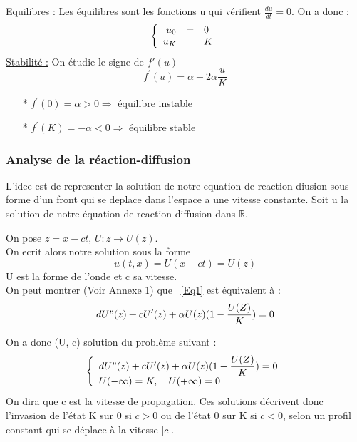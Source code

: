 \documentclass[a4paper,11pt]{article}
\begin{document}
\noindent\underline{Equilibres :} Les équilibres sont les fonctions u qui vérifient $\frac{du}{dt}=0$. On a donc :
\[
\left\{
\begin{array}{r c l}
u_0 &=& 0\\
u_K &=& K\\
\end{array}
\right.
\]
\underline{Stabilité :} On étudie le signe de $f'(u)$ 
$$f^\prime(u)= \alpha - 2 \alpha \dfrac{u}{K} $$

\begin{itemize}
    	\item[*] $f^\prime(0)=\alpha >0 \Rightarrow $ équilibre instable
        \item[*] $f^\prime(K)= -\alpha <0 \Rightarrow $ équilibre stable
	\end{itemize}


\subsubsection{Analyse de la réaction-diffusion}
\setcounter{equation}{0}
L'idee est de representer la solution de notre equation de
reaction-diusion sous forme d'un front qui se deplace dans l'espace a une vitesse constante.
Soit u la solution de notre équation de reaction-diffusion dans $\mathbb{R}$.

\noindent On pose $z=x-ct$, $U:z\rightarrow U(z)$.\\
On ecrit alors notre solution sous la forme
\begin{equation*}
u(t,x)=U(x-ct)=U(z)
\end{equation*}
U est la forme de l'onde et c sa vitesse.\\

On peut montrer (Voir Annexe 1) que ~\eqref{Eq1} est équivalent à :
\begin{equation*}
dU"(z)+c U'(z)+\alpha U(z)(1-\dfrac{U(Z)}{K})=0\\
\end{equation*} 

On a donc (U, c) solution du problème suivant :
\begin{equation} 
\left\{
\begin{array}{lcl}
dU"(z)+c U'(z)+\alpha U(z)(1-\dfrac{U(Z)}{K})=0 \\
U( - \infty )= K ,\quad U( + \infty )=0
\end{array}
\right.
\label{PbKPP }
\end{equation}
On dira que c est la vitesse de propagation. Ces solutions décrivent donc l'invasion de l'état K
sur 0 si $c > 0$ ou de l'état 0 sur K si $c< 0$, selon un profil constant qui se déplace à la vitesse
$|c|$.\\
\newline
\end{document}
